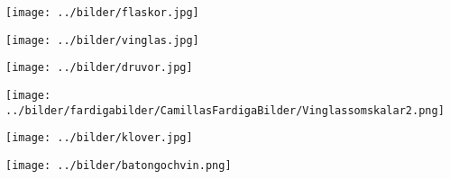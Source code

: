 %



\sclearpage

\sclearpage

\begin{intersong}
\begin{center}
\texttt{[image: ../bilder/flaskor.jpg]} 
\end{center}
\end{intersong}
\sclearpage


\sclearpage

\begin{intersong}
\begin{center}
\texttt{[image: ../bilder/vinglas.jpg]} 
\end{center}
\end{intersong}
\sclearpage


\sclearpage


\begin{intersong}
\begin{center}
\texttt{[image: ../bilder/druvor.jpg]} 
\end{center}
\end{intersong}
\sclearpage

\begin{intersong}
	\begin{center}
		\texttt{[image: ../bilder/fardigabilder/CamillasFardigaBilder/Vinglassomskalar2.png]} 
	\end{center}
\end{intersong}
\sclearpage

\begin{intersong}
	\begin{center}
		\texttt{[image: ../bilder/klover.jpg]} 
	\end{center}
\end{intersong}

\begin{intersong}
	\begin{center}
		\texttt{[image: ../bilder/batongochvin.png]} 
	\end{center}
\end{intersong}